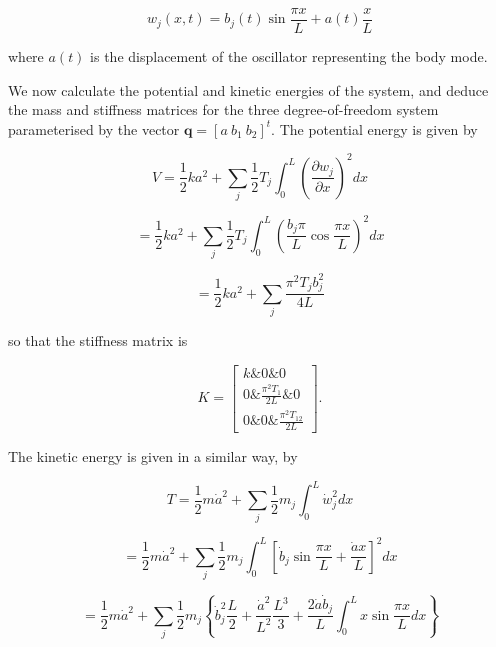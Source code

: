   \begin{equation*}w_j(x,t) = b_j(t) \sin \dfrac{\pi x}{L} + a(t)\dfrac{x}{L} 
  \tag{13}\end{equation*} 

  \noindent{}where $a(t)$ is the displacement of the oscillator representing 
  the body mode. 

  We now calculate the potential and kinetic energies of the system, and deduce 
  the mass and stiffness matrices for the three degree-of-freedom system 
  parameterised by the vector $\mathbf{q} = [a~b_1~b_2]^t$. The potential 
  energy is given by 

  \begin{equation*}V = \frac{1}{2} k a^2 +\sum_j{\dfrac{1}{2}T_j 
  \int_0^L{\left( \dfrac{\partial w_j}{\partial x} \right)^2 dx}} 
  \end{equation*} 

  \begin{equation*}= \frac{1}{2} k a^2 +\sum_j{\dfrac{1}{2}T_j \int_0^L{\left( 
  \dfrac{b_j \pi}{L} \cos \dfrac{\pi x}{L}\right)^2 dx}} \end{equation*} 

  \begin{equation*}= \frac{1}{2} k a^2 +\sum_j{\dfrac{\pi^2 T_j b_j^2}{4L}} 
  \tag{14}\end{equation*} 

  \noindent{}so that the stiffness matrix is 

  \begin{equation*}K =\begin{bmatrix}k \& 0 \& 0\\ 0 \& \frac{\pi^2 T_1}{2L} \& 
  0 \\ 0 \& 0 \& \frac{\pi^2 T_12}{2L}\end{bmatrix} . \tag{15}\end{equation*} 

  The kinetic energy is given in a similar way, by 

  \begin{equation*}T = \frac{1}{2} m \dot{a}^2 +\sum_j{\dfrac{1}{2}m_j 
  \int_0^L{\dot{w}_j^2 dx}} \end{equation*} 

  \begin{equation*}= \frac{1}{2} m \dot{a}^2 +\sum_j{\dfrac{1}{2}m_j 
  \int_0^L{\left[\dot{b}_j \sin \dfrac{\pi x}{L} + \dfrac{\dot{a}x}{L}\right]^2 
  dx}} \end{equation*} 

  \begin{equation*}= \frac{1}{2} m \dot{a}^2 +\sum_j{\dfrac{1}{2}m_j 
  \left\lbrace \dot{b}_j^2 \dfrac{L}{2} + \dfrac{\dot{a}^2}{L^2} \dfrac{L^3}{3} 
  + \dfrac{2 \dot{a} \dot{b}_j}{L} \int_0^L{x \sin \dfrac{\pi x}{L} 
  dx}\right\rbrace }\end{equation*} 

